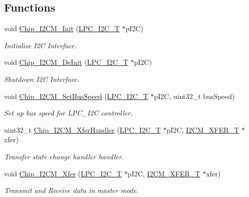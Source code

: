 \subsection*{Functions}
\begin{DoxyCompactItemize}
\item 
void \hyperlink{group___i2_c_m__18_x_x__43_x_x_gaa54fd5277f67ad6a319f010ee47107be}{Chip\+\_\+\+I2\+C\+M\+\_\+\+Init} (\hyperlink{struct_l_p_c___i2_c___t}{L\+P\+C\+\_\+\+I2\+C\+\_\+T} $\ast$p\+I2C)
\begin{DoxyCompactList}\small\item\em Initialize I2C Interface. \end{DoxyCompactList}\item 
void \hyperlink{group___i2_c_m__18_x_x__43_x_x_gaf4c9d08157514e8cc0d2bf4a870e85c5}{Chip\+\_\+\+I2\+C\+M\+\_\+\+De\+Init} (\hyperlink{struct_l_p_c___i2_c___t}{L\+P\+C\+\_\+\+I2\+C\+\_\+T} $\ast$p\+I2C)
\begin{DoxyCompactList}\small\item\em Shutdown I2C Interface. \end{DoxyCompactList}\item 
void \hyperlink{group___i2_c_m__18_x_x__43_x_x_ga741eebe9ada749637e7ee24bf1f7f392}{Chip\+\_\+\+I2\+C\+M\+\_\+\+Set\+Bus\+Speed} (\hyperlink{struct_l_p_c___i2_c___t}{L\+P\+C\+\_\+\+I2\+C\+\_\+T} $\ast$p\+I2C, uint32\+\_\+t bus\+Speed)
\begin{DoxyCompactList}\small\item\em Set up bus speed for L\+P\+C\+\_\+\+I2C controller. \end{DoxyCompactList}\item 
uint32\+\_\+t \hyperlink{group___i2_c_m__18_x_x__43_x_x_ga75095468463ed3ce0eb368165537780b}{Chip\+\_\+\+I2\+C\+M\+\_\+\+Xfer\+Handler} (\hyperlink{struct_l_p_c___i2_c___t}{L\+P\+C\+\_\+\+I2\+C\+\_\+T} $\ast$p\+I2C, \hyperlink{struct_i2_c_m___x_f_e_r___t}{I2\+C\+M\+\_\+\+X\+F\+E\+R\+\_\+T} $\ast$xfer)
\begin{DoxyCompactList}\small\item\em Transfer state change handler handler. \end{DoxyCompactList}\item 
void \hyperlink{group___i2_c_m__18_x_x__43_x_x_gad4b7e6761dd2450e45463a5acef9ee1a}{Chip\+\_\+\+I2\+C\+M\+\_\+\+Xfer} (\hyperlink{struct_l_p_c___i2_c___t}{L\+P\+C\+\_\+\+I2\+C\+\_\+T} $\ast$p\+I2C, \hyperlink{struct_i2_c_m___x_f_e_r___t}{I2\+C\+M\+\_\+\+X\+F\+E\+R\+\_\+T} $\ast$xfer)
\begin{DoxyCompactList}\small\item\em Transmit and Receive data in master mode. \end{DoxyCompactList}\item 

\end{DoxyCompactItemize}
